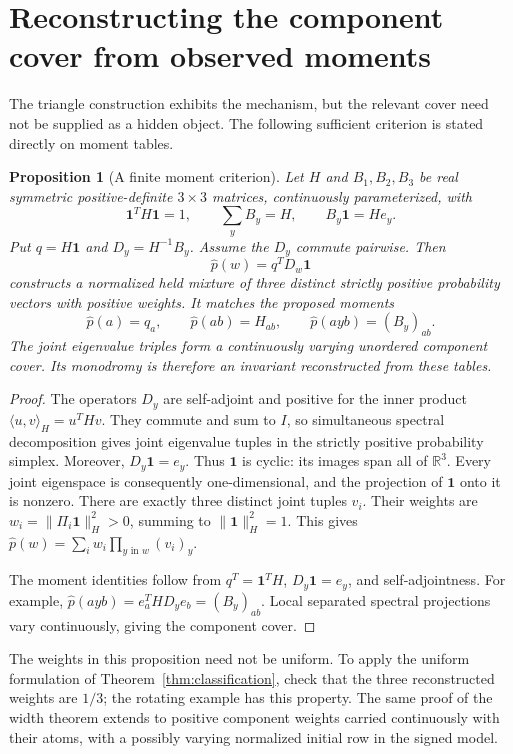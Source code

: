\documentclass[11pt]{article}
\newtheorem{proposition}[theorem]{Proposition}
\theoremstyle{definition}\newtheorem{definition}[theorem]{Definition}
\theoremstyle{remark}\newtheorem{remark}[theorem]{Remark}
\newcommand{\R}{\mathbb R}
\newcommand{\one}{\mathbf 1}
\begin{document}
\section{Reconstructing the component cover from observed moments}
The triangle construction exhibits the mechanism, but the relevant cover need not be supplied as a hidden object. The following sufficient criterion is stated directly on moment tables.

\begin{proposition}[A finite moment criterion]\label{prop:moments}
Let $H$ and $B_1,B_2,B_3$ be real symmetric positive-definite $3\times3$ matrices, continuously parameterized, with
\[
 \one^TH\one=1,\qquad \sum_yB_y=H,\qquad B_y\one=He_y.
\]
Put $q=H\one$ and $D_y=H^{-1}B_y$. Assume the $D_y$ commute pairwise. Then
\[
 \widehat p(w)=q^TD_w\one
\]
constructs a normalized held mixture of three distinct strictly positive probability vectors with positive weights. It matches the proposed moments
\[
 \widehat p(a)=q_a,\qquad \widehat p(ab)=H_{ab},\qquad
 \widehat p(ayb)=(B_y)_{ab}.
\]
The joint eigenvalue triples form a continuously varying unordered component cover. Its monodromy is therefore an invariant reconstructed from these tables.
\end{proposition}
\begin{proof}
The operators $D_y$ are self-adjoint and positive for the inner product $\langle u,v\rangle_H=u^THv$. They commute and sum to $I$, so simultaneous spectral decomposition gives joint eigenvalue tuples in the strictly positive probability simplex. Moreover, $D_y\one=e_y$. Thus $\one$ is cyclic: its images span all of $\R^3$. Every joint eigenspace is consequently one-dimensional, and the projection of $\one$ onto it is nonzero. There are exactly three distinct joint tuples $v_i$. Their weights are $w_i=\|\Pi_i\one\|_H^2>0$, summing to $\|\one\|_H^2=1$. This gives $\widehat p(w)=\sum_iw_i\prod_{y\text{ in }w}(v_i)_y$.

The moment identities follow from $q^T=\one^TH$, $D_y\one=e_y$, and self-adjointness. For example, $\widehat p(ayb)=e_a^THD_ye_b=(B_y)_{ab}$. Local separated spectral projections vary continuously, giving the component cover.
\end{proof}
The weights in this proposition need not be uniform. To apply the uniform formulation of Theorem~\ref{thm:classification}, check that the three reconstructed weights are $1/3$; the rotating example has this property. The same proof of the width theorem extends to positive component weights carried continuously with their atoms, with a possibly varying normalized initial row in the signed model.
\end{document}

